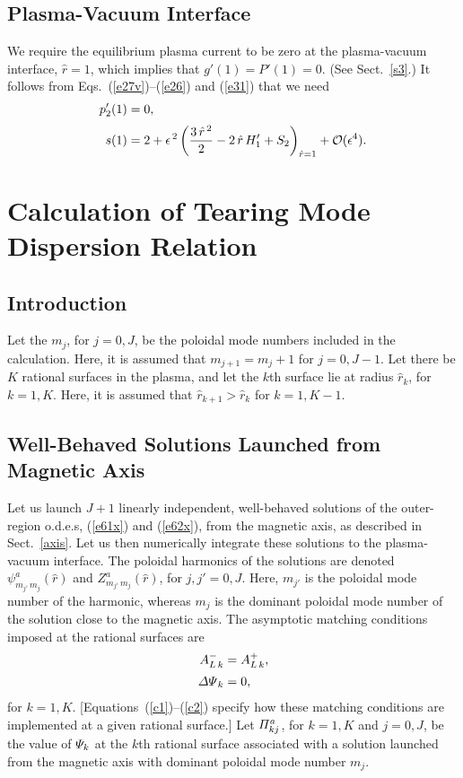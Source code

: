 \documentclass[12pt,prb,aps]{revtex4-1}
\begin{document}
\subsection{Plasma-Vacuum Interface}
We require the equilibrium plasma current to be zero at the plasma-vacuum interface, $\hat{r}=1$, which
implies that $g'(1)=P'(1)= 0$. (See Sect.~\ref{s3}.) It follows from Eqs.~(\ref{e27v})--(\ref{e26}) and (\ref{e31}) that we need\,\cite{am1}
\begin{align}
p_2'(1) &= 0,\label{e222}\\[0.5ex]
s(1) &= 2+ \epsilon^{\,2}\left(\frac{3\,\hat{r}^{\,2}}{2}-2\,\hat{r}\,H_1'+S_2\right)_{\hat{r}=1}
+{\cal O}(\epsilon^4).\label{e223}
\end{align}

\section{Calculation of  Tearing Mode Dispersion Relation}\label{etm}
\subsection{Introduction}
Let the $m_j$, for $j=0,J$, be the poloidal mode numbers included in the calculation. Here, it is assumed that $m_{j+1}=m_j+1$ for $j=0,J-1$. 
Let there be $K$ rational surfaces in the plasma, and let the $k$th surface lie at radius $\hat{r}_k$, for $k=1,K$. Here,
it is assumed that $\hat{r}_{k+1}>\hat{r}_k$ for $k=1,K-1$. 

\subsection{Well-Behaved Solutions Launched from Magnetic Axis}\label{axisl}
Let us launch $J+1$ linearly independent, well-behaved solutions of the outer-region o.d.e.s, (\ref{e61x}) and (\ref{e62x}), from the
magnetic axis, as described in Sect.~\ref{axis}. Let us then numerically integrate these solutions to the plasma-vacuum interface. The poloidal harmonics of
the solutions are denoted $\psi^a_{m_{j'}\,m_j}(\hat{r})$ and $Z^a_{m_{j'}\,m_j}(\hat{r})$, for $j,j'=0,J$. Here,
$m_{j'}$ is the poloidal mode number of the harmonic, whereas $m_j$ is the dominant poloidal mode number of the solution close to the
magnetic axis. The asymptotic matching conditions imposed at the rational surfaces are
\begin{align}
A_{L\,k}^{-} &= A_{L\,k}^+,\\[0.5ex]
{\mit\Delta\Psi}_k &= 0,
\end{align}
for $k=1,K$. [Equations~(\ref{c1})--(\ref{c2}) specify how these matching conditions are implemented at a given rational surface.]
Let ${\mit\Pi}_{kj}^a$, for   $k=1,K$ and $j=0,J$,  be the value of ${\mit\Psi}_k$ at the $k$th rational surface associated with a solution launched
from the magnetic axis with dominant poloidal mode number $m_j$. 
\end{document}
